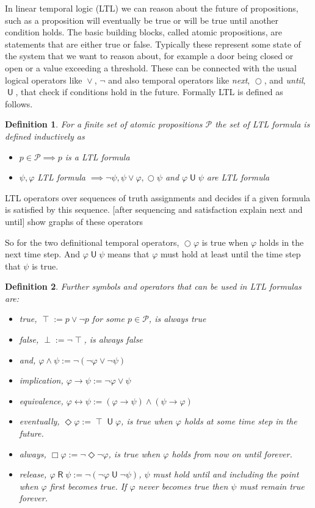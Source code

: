 \documentclass[12pt, a4paper]{article}
\theoremstyle{plain}
\newtheorem*{definition}{Definition}
\DeclareMathOperator{\true}{\top}
\DeclareMathOperator{\false}{\bot}
\DeclareMathOperator{\an}{\wedge}
\DeclareMathOperator{\od}{\vee}
\DeclareMathOperator{\imply}{\rightarrow}
\DeclareMathOperator{\equivalent}{\leftrightarrow}
\DeclareMathOperator{\nxt}{\bigcirc}
\DeclareMathOperator{\until}{\textsf{U}}
\DeclareMathOperator{\release}{\textsf{R}}
\DeclareMathOperator{\eventually}{\Diamond}
\DeclareMathOperator{\always}{\Box}
\renewcommand{\phi}{\varphi}
\begin{document}
In linear temporal logic (LTL) we can reason about the future of propositions, such as a proposition will eventually be true or will be true until another condition holds. The basic building blocks, called atomic propositions, are statements that are either true or false. Typically these represent some state of the system that we want to reason about, for example a door being closed or open or a value exceeding a threshold. These can be connected with the usual logical operators like $\od$, $\neg$ and also temporal operators like \emph{next}, $\nxt$, and \emph{until}, $\until$, that check if conditions hold in the future. Formally LTL is defined as follows.

\begin{definition}
	For a finite set of atomic propositions $\mathcal{P}$ the set of \emph{LTL formula} is defined inductively as
	\begin{itemize}
		\item $p \in \mathcal{P} \implies p$ is a LTL formula
		\item $\psi, \phi$ LTL formula $\implies \neg\psi, \psi\od\phi, \nxt\psi$ and $\phi\until\psi$ are LTL formula
	\end{itemize}
\end{definition}

LTL operators over sequences of truth assignments and decides if a given formula is satisfied by this sequence. [after sequencing and satisfaction explain next and until] show graphs of these operators

So for the two definitional temporal operators, $\nxt\phi$ is true when $\phi$ holds in the next time step. And $\phi\until\psi$ means that $\phi$ must hold at least until the time step that $\psi$ is true.

\begin{definition}
	Further symbols and operators that can be used in LTL formulas are:
	\begin{itemize}
		\item \emph{true}, $\true := p\od\neg p$ for some $p \in \mathcal{P}$, is always true
		\item \emph{false}, $\false := \neg\true$, is always false
		\item \emph{and}, $\phi\an\psi := \neg(\neg\phi\od\neg\psi)$
		\item \emph{implication}, $\phi\imply\psi := \neg\phi\od\psi$
		\item \emph{equivalence}, $\phi\equivalent\psi := (\phi\imply\psi) \an (\psi\imply\phi)$
		\item \emph{eventually}, $\eventually\phi := \true\until\phi$, is true when $\phi$ holds at some time step in the future.
		\item \emph{always}, $\always\phi := \neg\eventually\neg\phi$, is true when $\phi$ holds from now on until forever.
		\item \emph{release}, $\phi\release\psi := \neg(\neg\phi\until\neg\psi)$, $\psi$ must hold until and including the point when $\phi$ first becomes true. If $\phi$ never becomes true then $\psi$ must remain true forever.
	\end{itemize}
\end{definition}
\end{document}
